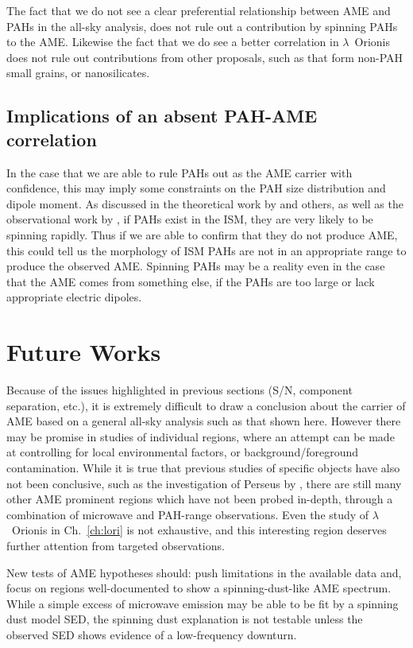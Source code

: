               The fact that we do not see a clear preferential relationship between AME and PAHs in the all-sky analysis, does not rule out a contribution by spinning PAHs to the AME. Likewise the fact that we do see a better correlation in $\lambda$~Orionis does not rule out contributions from other proposals, such as that form non-PAH small grains, or nanosilicates.


              \subsection{Implications of an absent PAH-AME correlation}
                  In the case that we are able to rule PAHs out as the AME carrier with confidence, this may imply some constraints on the PAH size distribution and dipole moment. As discussed in the theoretical work by \cite{draine98a, ali-haimoud10} and others, as well as the observational work by \cite{hensley16}, if PAHs exist in the ISM, they are very likely to be spinning rapidly. Thus if we are able to confirm that they do not produce AME, this could tell us the morphology of ISM PAHs are not in an appropriate range to produce the observed AME. Spinning PAHs may be a reality even in the case that the AME comes from something else, if the PAHs are too large or lack appropriate electric dipoles.

              \section{Future Works}
                  Because of the issues highlighted in previous sections (S/N, component separation, etc.), it is extremely difficult to draw a conclusion about the carrier of AME based on a general all-sky analysis such as that shown here. However there may be promise in studies of individual regions, where an attempt can be made at controlling for local environmental factors, or background/foreground contamination. While it is true that previous studies of specific objects have also not been conclusive, such as the investigation of Perseus by \cite{tibbs11}, there are still many other AME prominent regions which have not been probed in-depth, through a combination of microwave and PAH-range observations. Even the study of $\lambda$~Orionis in Ch.~\ref{ch:lori} is not exhaustive, and this interesting region deserves further attention from targeted observations.

                New tests of AME hypotheses should: push limitations in the available data and, focus on regions well-documented to show a spinning-dust-like AME spectrum. While a simple excess of microwave emission may be able to be fit by a spinning dust model SED, the spinning dust explanation is not testable unless the observed SED shows evidence of a low-frequency downturn.

